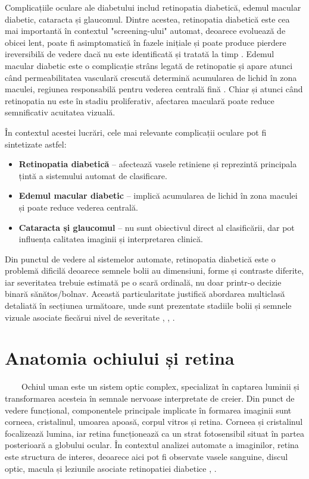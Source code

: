 \documentclass[12pt, a4paper, twoside, romanian]{teza-upb}
\begin{document}
Complicațiile oculare ale diabetului includ retinopatia diabetică, edemul macular diabetic, cataracta și
glaucomul. Dintre acestea, retinopatia diabetică este cea mai importantă în contextul "screening-ului"
automat, deoarece evoluează de obicei lent, poate fi asimptomatică în fazele inițiale și
poate produce pierdere ireversibilă de vedere dacă nu este identificată și tratată
la timp \cite{18_wong2016diabetic}. Edemul macular diabetic este o complicație strâns legată de retinopatie
și apare atunci când permeabilitatea vasculară crescută determină acumularea de lichid în
zona maculei, regiunea responsabilă pentru vederea centrală fină \cite{18_wong2016diabetic}. Chiar și atunci
când retinopatia nu este în stadiu proliferativ, afectarea maculară poate reduce semnificativ
acuitatea vizuală.
\bigskip

În contextul acestei lucrări, cele mai relevante complicații oculare pot fi sintetizate astfel:

\begin{itemize}
  \item \textbf{Retinopatia diabetică} -- afectează vasele retiniene și reprezintă principala țintă a sistemului automat de clasificare.
  \item \textbf{Edemul macular diabetic} -- implică acumularea de lichid în zona maculei și
    poate reduce vederea centrală.
  \item \textbf{Cataracta și glaucomul} -- nu sunt obiectivul direct al clasificării, dar pot
    influența calitatea imaginii și interpretarea clinică.
\end{itemize}

\bigskip

Din punctul de vedere al sistemelor automate, retinopatia diabetică este o problemă
dificilă deoarece semnele bolii au dimensiuni, forme și contraste diferite, iar severitatea
trebuie estimată pe o scară ordinală, nu doar printr-o decizie binară sănătos/bolnav.
Această particularitate justifică abordarea multiclasă detaliată în secțiunea următoare, unde sunt
prezentate stadiile bolii și semnele vizuale asociate fiecărui nivel de severitate
\cite{3_gulshan2016development}, \cite{6_wang2021deep}, \cite{14_liu2022deepdrid}.

\section{Anatomia ochiului și retina}

\ \ \ \ Ochiul uman este un sistem optic complex, specializat în captarea luminii și
transformarea acesteia în semnale nervoase interpretate de creier. Din punct de vedere
funcțional, componentele principale implicate în formarea imaginii sunt corneea, cristalinul, umoarea apoasă,
corpul vitros și retina. Corneea și cristalinul focalizează lumina, iar retina funcționează
ca un strat fotosensibil situat în partea posterioară a globului ocular. În
contextul analizei automate a imaginilor, retina este structura de interes, deoarece aici
pot fi observate vasele sanguine, discul optic, macula și leziunile asociate retinopatiei
diabetice \cite{18_wong2016diabetic}, \cite{13_staal2004ridge}.
\bigskip
\end{document}

